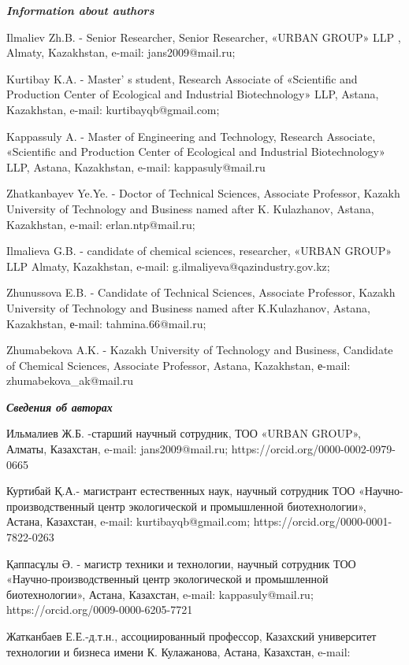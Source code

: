 \begin{authorinfo}
\emph{{\bfseries Information about authors}}

Ilmaliev Zh.B. - Senior Researcher, Senior Researcher, «URBAN GROUP» LLP
, Almaty, Kazakhstan, e-mail:
jans2009@mail.ru;

Kurtibay K.A. - Master' s student, Research Associate of
«Scientific and Production Center of Ecological and Industrial
Biotechnology» LLP, Astana, Kazakhstan, e-mail:
kurtibayqb@gmail.com;

Kappassuly A. - Master of Engineering and Technology, Research
Associate, «Scientific and Production Center of Ecological and
Industrial Biotechnology» LLP, Astana, Kazakhstan, e-mail:
kappasuly@mail.ru

Zhatkanbayev Ye.Ye. - Doctor of Technical Sciences, Associate Professor,
Kazakh University of Technology and Business named after K. Kulazhanov,
Astana, Kazakhstan, e-mail:
erlan.ntp@mail.ru;

Ilmalieva G.B. - candidate of chemical sciences, researcher, «URBAN
GROUP» LLP Almaty, Kazakhstan, e-mail:
g.ilmaliyeva@qazindustry.gov.kz;

Zhunussova E.B. - Candidate of Technical Sciences, Associate Professor,
Kazakh University of Technology and Business named after K.Kulazhanov,
Astana, Kazakhstan, е-mail:
tahmina.66@mail.ru;

Zhumabekova A.K. - Kazakh University of Technology and Business,
Candidate of Chemical Sciences, Associate Professor, Astana, Kazakhstan,
е-mail:
zhumabekova\_ak@mail.ru

\emph{{\bfseries Сведения об авторах}}

Ильмалиев Ж.Б. -старший научный сотрудник, ТОО «URBAN GROUP», Алматы,
Казахстан, e-mail:
jans2009@mail.ru;
https://orcid.org/0000-0002-0979-0665

Куртибай Қ.А.- магистрант естественных наук, научный сотрудник ТОО
«Научно-производственный центр экологической и промышленной
биотехнологии», Астана, Казахстан, e-mail:
kurtibayqb@gmail.com;
https://orcid.org/0000-0001-7822-0263

Қаппасұлы Ә. - магистр техники и технологии, научный сотрудник ТОО
«Научно-производственный центр экологической и промышленной
биотехнологии», Астана, Казахстан, e-mail:
kappasuly@mail.ru;
https://orcid.org/0009-0000-6205-7721

Жатканбаев Е.Е.-д.т.н., ассоциированный профессор, Казахский университет
технологии и бизнеса имени К. Кулажанова, Астана, Казахстан, e-mail:


\end{authorinfo}
